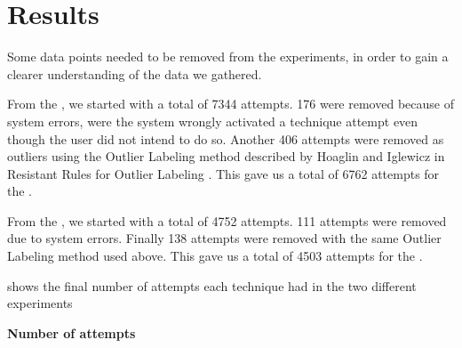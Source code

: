 \section{Results}\label{sec:results}
Some data points needed to be removed from the experiments, in order to gain a clearer understanding of the data we gathered. 

From the \target, we started with a total of 7344 attempts.
176 were removed because of system errors, were the system wrongly activated a technique attempt even though the user did not intend to do so.
Another 406 attempts were removed as outliers using the Outlier Labeling method described by Hoaglin and Iglewicz in Resistant Rules for Outlier Labeling \cite{Hoaglin:1987}.
This gave us a total of 6762 attempts for the \target.

From the \accuracy, we started with a total of 4752 attempts.
111 attempts were removed due to system errors. 
Finally 138 attempts were removed with the same Outlier Labeling method used above.
This gave us a total of 4503 attempts for the \accuracy.

 shows the final number of attempts each technique had in the two different experiments

\begin{table}[H]
	\centering
	\textbf{Number of attempts}\\[4pt]
	\begin{adjustbox}{width=\columnwidth}
	\end{adjustbox}
	\caption{Number of attempts for each technique in each experiment}
	\label{tab:numberOfAttempts}
\end{table}


